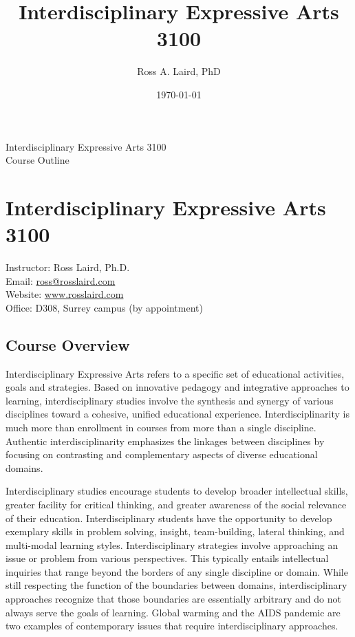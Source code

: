 \documentclass[letterpaper,10pt,headsepline]{scrreprt}
\author{Ross A. Laird, PhD}
\title{Interdisciplinary Expressive Arts 3100}
\date{\today}
\begin{document}
\pagestyle{empty}
\vspace*{7em} 
\begin{center}
\huge{Interdisciplinary Expressive Arts 3100}\\
\vspace*{1em} 
\large{Course Outline}
\end{center}
\clearpage
\pagestyle{scrheadings}
\tableofcontents
\chapter{Interdisciplinary Expressive Arts 3100}
Instructor: Ross Laird, Ph.D.\\ 
Email: \url{ross@rosslaird.com}\\
Website: \url{www.rosslaird.com}\\
Office: D308, Surrey campus (by appointment)\\

\section{Course Overview}

Interdisciplinary Expressive Arts refers to a specific set of educational activities, goals and strategies. Based on innovative pedagogy and integrative approaches to learning, interdisciplinary studies involve the synthesis and synergy of various disciplines toward a cohesive, unified educational experience. Interdisciplinarity is much more than enrollment in courses from more than a single discipline. Authentic interdisciplinarity emphasizes the linkages between disciplines by focusing on contrasting and complementary aspects of diverse educational domains.

Interdisciplinary studies encourage students to develop broader intellectual skills, greater facility for critical thinking, and greater awareness of the social relevance of their education. Interdisciplinary students have the opportunity to develop exemplary skills in problem solving, insight, team-building, lateral thinking, and multi-modal learning styles. Interdisciplinary strategies involve approaching an issue or problem from various perspectives. This typically entails intellectual inquiries that range beyond the borders of any single discipline or domain. While still respecting the function of the boundaries between domains, interdisciplinary approaches recognize that those boundaries are essentially arbitrary and do not always serve the goals of learning. Global warming and the AIDS pandemic are two examples of contemporary issues that require interdisciplinary approaches. 
\end{document}
